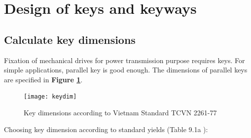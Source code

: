 \clearpage

\section{Design of keys and keyways}
\subsection{Calculate key dimensions}

Fixation of mechanical drives for power transmission purpose requires keys. For simple applications, parallel key is good enough. The dimensions of parallel keys are specified in \textbf{Figure \ref{keydim}}.

\begin{figure}[ht]
	\centering
	\texttt{[image: keydim]}
	\caption{Key dimensions according to Vietnam Standard TCVN 2261-77}
	\label{keydim}
\end{figure}

Choosing key dimension according to standard yields (Table 9.1a \cite{tk1}):

